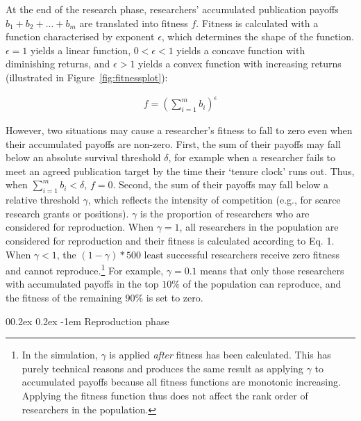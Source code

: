 \documentclass[
  british,
  a4paper,
  ,man,mask,floatsintext]{apa6}
\makeatletter
\let\oldparagraph\paragraph
\renewcommand{\paragraph}{
    \@ifstar
      \xxxParagraphStar
      \xxxParagraphNoStar
  }
\newcommand{\xxxParagraphStar}[1]{\oldparagraph*{#1}\mbox{}}
\newcommand{\xxxParagraphNoStar}[1]{\oldparagraph{#1}\mbox{}}
\renewcommand{\paragraph}{\@startsection{paragraph}{4}{\parindent}%
  {0\baselineskip \@plus 0.2ex \@minus 0.2ex}%
  {-1em}%
  {\normalfont\normalsize\bfseries\itshape\typesectitle}}
\makeatother
\begin{document}
At the end of the research phase, researchers' accumulated publication payoffs \(b_1 + b_2 + ... + b_m\) are translated into fitness \(f\).
Fitness is calculated with a function characterised by exponent \(\epsilon\), which determines the shape of the function. \(\epsilon = 1\) yields a linear function, \(0 < \epsilon < 1\) yields a concave function with diminishing returns, and \(\epsilon > 1\) yields a convex function with increasing returns (illustrated in Figure~\ref{fig:fitnessplot}):

\begin{align}
f = (\sum_{i=1}^{m} b_i)^\epsilon
\end{align}

However, two situations may cause a researcher's fitness to fall to zero even when their accumulated payoffs are non-zero.
First, the sum of their payoffs may fall below an absolute survival threshold \(\delta\), for example when a researcher fails to meet an agreed publication target by the time their `tenure clock' runs out.
Thus, when \(\sum_{i=1}^{m} b_i < \delta\), \(f = 0\).
Second, the sum of their payoffs may fall below a relative threshold \(\gamma\), which reflects the intensity of competition (e.g., for scarce research grants or positions).
\(\gamma\) is the proportion of researchers who are considered for reproduction.
When \(\gamma = 1\), all researchers in the population are considered for reproduction and their fitness is calculated according to Eq. 1.
When \(\gamma < 1\), the \((1 - \gamma)*500\) least successful researchers receive zero fitness and cannot reproduce.\footnote{In the simulation, \(\gamma\) is applied \emph{after} fitness has been calculated. This has purely technical reasons and produces the same result as applying \(\gamma\) to accumulated payoffs
  because all fitness functions are monotonic increasing.
  Applying the fitness function thus does not affect the rank order of researchers in the population.}
For example, \(\gamma = 0.1\) means that only those researchers with accumulated payoffs in the top \(10\%\) of the population can reproduce, and the fitness of the remaining \(90\%\) is set to zero.

\paragraph{Reproduction phase}\label{reproduction-phase}
\end{document}
